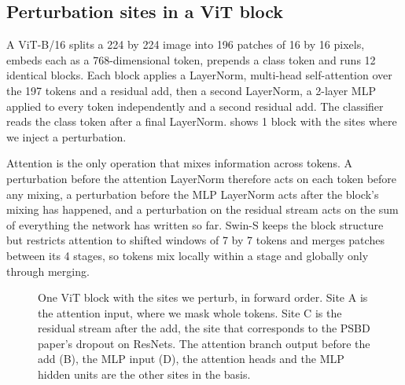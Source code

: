 \subsection{Perturbation sites in a ViT block}
A ViT-B/16 \cite{dosovitskiy2021an} splits a 224 by 224 image into 196 patches of 16 by 16 pixels, embeds each as a 768-dimensional token, prepends a class token and runs 12 identical blocks. Each block applies a LayerNorm, multi-head self-attention over the 197 tokens and a residual add, then a second LayerNorm, a 2-layer MLP applied to every token independently and a second residual add. The classifier reads the class token after a final LayerNorm.  shows 1 block with the sites where we inject a perturbation.

Attention is the only operation that mixes information across tokens. A perturbation before the attention LayerNorm therefore acts on each token before any mixing, a perturbation before the MLP LayerNorm acts after the block's mixing has happened, and a perturbation on the residual stream acts on the sum of everything the network has written so far. Swin-S \cite{liu2021swin} keeps the block structure but restricts attention to shifted windows of 7 by 7 tokens and merges patches between its 4 stages, so tokens mix locally within a stage and globally only through merging.

\begin{figure}[t]
\centering

\caption{One ViT block with the sites we perturb, in forward order. Site A is the attention input, where we mask whole tokens. Site C is the residual stream after the add, the site that corresponds to the PSBD paper's dropout on ResNets. The attention branch output before the add (B), the MLP input (D), the attention heads and the MLP hidden units are the other sites in the basis.}
\label{fig:vit-block}
\end{figure}
